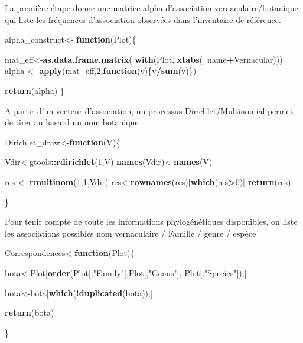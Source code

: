 \documentclass[
  11pt,
  french,
  A4paper,
  extrafontsizes,onecolumn,openright
  ]{memoir}
\newenvironment{Shaded}{\begin{snugshade}}{\end{snugshade}}
\newcommand{\KeywordTok}[1]{\textcolor[rgb]{0.13,0.29,0.53}{\textbf{#1}}}
\newcommand{\DecValTok}[1]{\textcolor[rgb]{0.00,0.00,0.81}{#1}}
\newcommand{\StringTok}[1]{\textcolor[rgb]{0.31,0.60,0.02}{#1}}
\newcommand{\ControlFlowTok}[1]{\textcolor[rgb]{0.13,0.29,0.53}{\textbf{#1}}}
\newcommand{\OperatorTok}[1]{\textcolor[rgb]{0.81,0.36,0.00}{\textbf{#1}}}
\newcommand{\NormalTok}[1]{#1}
\begin{document}
La première étape donne une matrice alpha d'association
vernaculaire/botanique qui liste les fréquences d'association observées
dans l'inventaire de référence.

\begin{Shaded}
\begin{Highlighting}[]
\NormalTok{alpha_construct<-}\StringTok{  }\ControlFlowTok{function}\NormalTok{(Plot)\{}
  
\NormalTok{  mat_eff<-}\KeywordTok{as.data.frame.matrix}\NormalTok{(}
    \KeywordTok{with}\NormalTok{(Plot, }\KeywordTok{xtabs}\NormalTok{(}\OperatorTok{~}\NormalTok{name}\OperatorTok{+}\NormalTok{Vernacular)))}
\NormalTok{  alpha <-}\StringTok{ }\KeywordTok{apply}\NormalTok{(mat_eff,}\DecValTok{2}\NormalTok{,}\ControlFlowTok{function}\NormalTok{(v)\{v}\OperatorTok{/}\KeywordTok{sum}\NormalTok{(v)\})}
  
  \KeywordTok{return}\NormalTok{(alpha)}
\NormalTok{\}}
\end{Highlighting}
\end{Shaded}

A partir d'un vecteur d'association, un processus Dirichlet/Multinomial
permet de tirer au hasard un nom botanique

\begin{Shaded}
\begin{Highlighting}[]
\NormalTok{Dirichlet_draw<-}\ControlFlowTok{function}\NormalTok{(V)\{}
  
\NormalTok{  Vdir<-gtools}\OperatorTok{::}\KeywordTok{rdirichlet}\NormalTok{(}\DecValTok{1}\NormalTok{,V)}
  \KeywordTok{names}\NormalTok{(Vdir)<-}\KeywordTok{names}\NormalTok{(V)}
  
\NormalTok{  res <-}\StringTok{ }\KeywordTok{rmultinom}\NormalTok{(}\DecValTok{1}\NormalTok{,}\DecValTok{1}\NormalTok{,Vdir)}
\NormalTok{  res<-}\KeywordTok{rownames}\NormalTok{(res)[}\KeywordTok{which}\NormalTok{(res}\OperatorTok{>}\DecValTok{0}\NormalTok{)]}
  \KeywordTok{return}\NormalTok{(res)}
  
\NormalTok{\}}
\end{Highlighting}
\end{Shaded}

Pour tenir compte de toute les informations phylogénétiques disponibles,
on liste les associations possibles nom vernaculaire / Famille / genre /
espèce

\begin{Shaded}
\begin{Highlighting}[]
\NormalTok{Correspondences<-}\ControlFlowTok{function}\NormalTok{(Plot)\{}
  
\NormalTok{  bota<-Plot[}\KeywordTok{order}\NormalTok{(Plot[,}\StringTok{"Family"}\NormalTok{],Plot[,}\StringTok{"Genus"}\NormalTok{],}
\NormalTok{                   Plot[,}\StringTok{"Species"}\NormalTok{]),]}
  
\NormalTok{  bota<-bota[}\KeywordTok{which}\NormalTok{(}\OperatorTok{!}\KeywordTok{duplicated}\NormalTok{(bota)),]}
  
  \KeywordTok{return}\NormalTok{(bota)}
  
\NormalTok{\} }
\end{Highlighting}
\end{Shaded}
\end{document}
